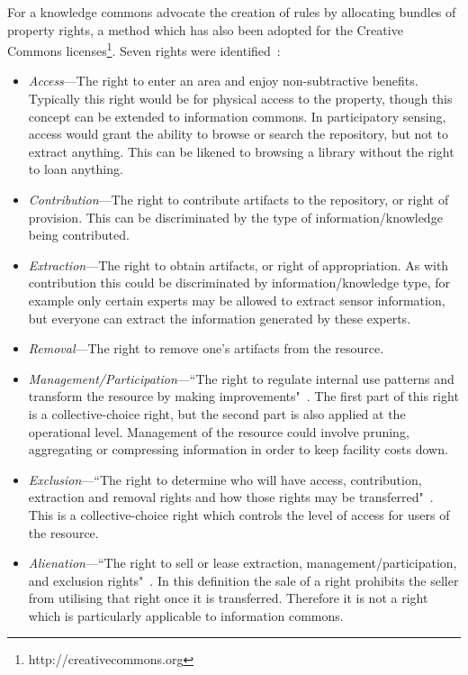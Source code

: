 For a knowledge commons  advocate the creation of rules by allocating bundles of property rights, a method which has also been adopted for the Creative Commons licenses\footnote{http://creativecommons.org}. 
Seven rights were identified~\citep{Schlager1992}:
\begin{itemize}
\item \emph{Access}---The right to enter an area and enjoy non-subtractive benefits. Typically this right would be for physical access to the property, though this concept can be extended to information commons. 
In participatory sensing, access would grant the ability to browse or search the repository, but not to extract anything. This can be likened to browsing a library without the right to loan anything. 
\item \emph{Contribution}---The right to contribute artifacts to the repository, or right of provision. This can be discriminated by the type of information/knowledge being contributed. 
\item \emph{Extraction}---The right to obtain artifacts, or right of appropriation. 
As with contribution this could be discriminated by information/knowledge type, for example only certain experts may be allowed to extract sensor information, but everyone can extract the information generated by these experts.
\item \emph{Removal}---The right to remove one's artifacts from the resource.
\item \emph{Management/Participation}---``The right to regulate internal use patterns and transform the resource by making improvements"~\cite[p.52]{Ostrom2007a}. 
The first part of this right is a collective-choice right, but the second part is also applied at the operational level. 
Management of the resource could involve pruning, aggregating or compressing information in order to keep facility costs down.
\item \emph{Exclusion}---``The right to determine who will have access, contribution, extraction and removal rights and how those rights may be transferred"~\cite[p.53]{Ostrom2007a}. 
This is a collective-choice right which controls the level of access for users of the resource. 
\item \emph{Alienation}---``The right to sell or lease extraction, management/participation, and exclusion rights"~\cite[p.53]{Ostrom2007a}. In this definition the sale of a right prohibits the seller from utilising that right once it is transferred. Therefore it is not a right which is particularly applicable to information commons.
\end{itemize}

